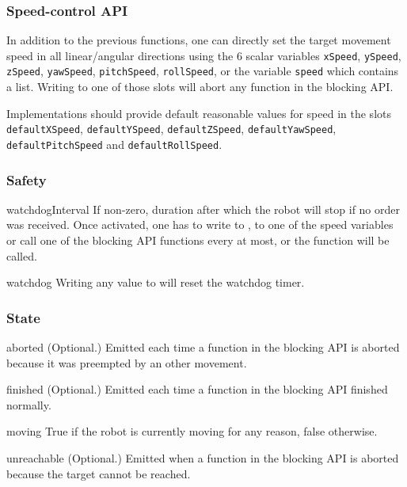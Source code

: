 \subsubsection{Speed-control API}

In addition to the previous functions, one can directly set the target
movement speed in all linear/angular directions using the 6 scalar variables
\lstinline{xSpeed}, \lstinline{ySpeed}, \lstinline{zSpeed},
\lstinline{yawSpeed}, \lstinline{pitchSpeed}, \lstinline{rollSpeed}, or the
variable \lstinline{speed} which contains a list.  Writing to one of those
slots will abort any function in the blocking API.

Implementations should provide default reasonable values for speed in the
slots \lstinline{defaultXSpeed}, \lstinline{defaultYSpeed},
\lstinline{defaultZSpeed}, \lstinline{defaultYawSpeed},
\lstinline{defaultPitchSpeed} and \lstinline{defaultRollSpeed}.

\subsubsection{Safety}

\begin{urbiscriptapi}
\item[watchdogInterval] If non-zero, duration after which the robot will
  stop if no order was received. Once activated, one has to write to
  , to one of the speed variables or call one of the
  blocking API functions every  at most, or the
   function will be called.

\item[watchdog] Writing any value to  will reset the
  watchdog timer.
\end{urbiscriptapi}

\subsubsection{State}

\begin{urbiscriptapi}
\item[aborted]{} (Optional.) Emitted each time a function in the blocking
  API is aborted because it was preempted by an other movement.


\item[finished]{} (Optional.) Emitted each time a function in the blocking
  API finished normally.


\item[moving] True if the robot is currently moving for any reason, false
  otherwise.


\item[unreachable]{} (Optional.) Emitted when a function in the blocking API
  is aborted because the target cannot be reached.
\end{urbiscriptapi}

